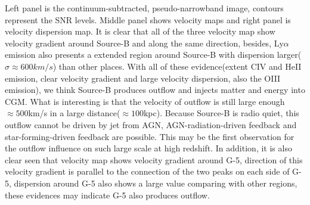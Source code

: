 \documentclass[../Results.tex]{subfiles}
\begin{document}
	Left panel is the continuum-subtracted, pseudo-narrowband image, contours represent the SNR levels. Middle panel shows velocity maps and right panel is velocity dispersion map. It is clear that all of the three velocity map show velocity gradient around Source-B and along the same direction, besides, Ly$\alpha$ emission also presents a extended region around Source-B with dispersion larger($\sigma \approx 600km/s$) than other places. With all of these evidence(extent CIV and HeII emission, clear velocity gradient and large velocity dispersion, also the OIII emission\cite{cai2017discovery}), we think Source-B produces outflow and injects matter and energy into CGM. What is interesting is that the velocity of outflow is still large enough $\approx 500$km/s in a large distance($\approx 100$kpc). Because Source-B is radio quiet, this outflow cannot be driven by jet from AGN, AGN-radiation-driven feedback and star-forming-driven feedback are possible. This may be the first observation for the outflow influence on such large scale at high redshift. In addition, it is also clear seen that velocity map shows velocity gradient around G-5, direction of this velocity gradient is parallel to the connection of the two peaks on each side of G-5, dispersion around G-5 also shows a large value comparing with other regions, these evidences may indicate G-5 also produces outflow.
	
\end{document}
